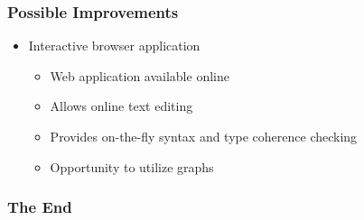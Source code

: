 \documentclass{beamer}
\begin{document}
\begin{frame}
    \frametitle{Possible Improvements}
    \begin{itemize}
        \item Interactive browser application
            \begin{itemize}
                \item Web application available online
                \item Allows online text editing
                \item Provides on-the-fly syntax and type coherence checking
                \item Opportunity to utilize graphs
            \end{itemize}
    \end{itemize}
\end{frame}


\begin{frame}
    \frametitle{The End}
    
\end{frame}
\end{document}
